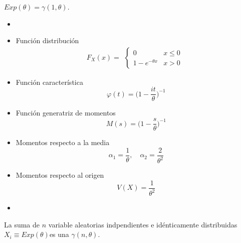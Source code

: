 \begin{obs}
  $Exp (\theta) = \gamma(1, \theta)$.
\end{obs}

\begin{prop}
  \begin{itemize}
    \item []
    \item Función distribución
      \[ 
        F_{X}(x) =
        \begin{aligned}
          \begin{cases}
            0 & x \leq 0 \\
            1 - e^{-\theta x} & x > 0
          \end{cases}
        \end{aligned} 
      \] 
    \item Función característica
      \[ 
        \varphi(t) = \Big ( 1 - \frac{i t}{\theta} \Big )^{-1} 
      \] 
    \item Función generatriz de momentos
      \[ 
        M(s) = \Big ( 1 - \frac{s}{\theta} \Big ) ^{-1}
      \] 
    \item Momentos respecto a la media
      \[ 
        \alpha_{1} = \frac{1}{\theta}, \quad \alpha_{2} = \frac{2}{\theta^{2}}
      \] 
    \item Momentos respecto al origen
      \[ 
        V(X) = \frac{1}{\theta^{2}} 
      \] 
    \item 
  \end{itemize}
\end{prop}

\begin{theo}
  La suma de $n$ variable aleatorias indpendientes e idénticamente distribuidas $X_{i} \equiv Exp (\theta)$es una $\gamma(n, \theta)$.
\end{theo}

